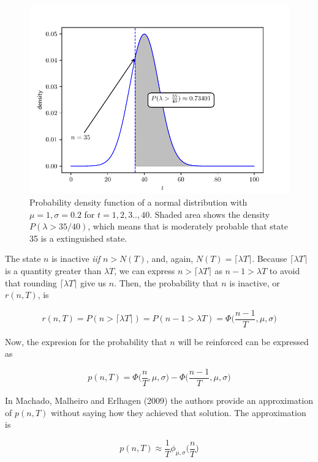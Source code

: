 \documentclass[11pt]{article}
\begin{document}
    \begin{figure}[H]
        \centering
        \includegraphics[scale=0.5]{lambda_nT}
        \caption{Probability density function of a normal distribution with $\mu = 1, \sigma = 0.2$ for $t = 1,2,3..,40$.
        Shaded area shows the density $P(\lambda > 35/40)$, which means that is moderately probable that state 35
        is a extinguished state.}
    \end{figure}

    The state $n$ is inactive \textit{iif} $n > N(T)$, and, again, $N(T) = \lceil \lambda T \rceil$.
    Because $\lceil \lambda T \rceil$ is a quantity greater than $\lambda T$, we can express $n > \lceil \lambda T \rceil$
    as $n - 1 > \lambda T$ to avoid that rounding $\lceil \lambda T \rceil$ give us $n$.
    Then, the probability that $n$ is inactive, or $r(n,T)$, is

    \[
        r(n,T) = P(n > \lceil \lambda T \rceil) = P(n - 1 > \lambda T) = \Phi \Big( \frac{n-1}{T},\mu,\sigma \Big)
    \]

    Now, the expresion for the probability that $n$ will be reinforced can be expressed as

    \[
        p(n,T) = \Phi \Big ( \frac{n}{T}, \mu, \sigma \Big) - \Phi \Big ( \frac{n - 1}{T},\mu,\sigma \Big)
    \]

    In Machado, Malheiro and Erlhagen (2009) the authors provide an approximation of $p(n,T)$ without saying how they
    achieved that solution. The approximation is

    \[
        p(n,T) \approx \frac{1}{T} \phi_{\mu,\sigma} \Big(\frac{n}{T}\Big)
    \]
\end{document}

